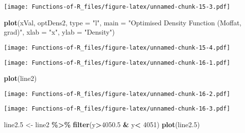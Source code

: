 \documentclass[
]{article}
\newenvironment{Shaded}{\begin{snugshade}}{\end{snugshade}}
\newcommand{\AttributeTok}[1]{\textcolor[rgb]{0.13,0.29,0.53}{#1}}
\newcommand{\CommentTok}[1]{\textcolor[rgb]{0.56,0.35,0.01}{\textit{#1}}}
\newcommand{\DecValTok}[1]{\textcolor[rgb]{0.00,0.00,0.81}{#1}}
\newcommand{\FloatTok}[1]{\textcolor[rgb]{0.00,0.00,0.81}{#1}}
\newcommand{\FunctionTok}[1]{\textcolor[rgb]{0.13,0.29,0.53}{\textbf{#1}}}
\newcommand{\NormalTok}[1]{#1}
\newcommand{\OtherTok}[1]{\textcolor[rgb]{0.56,0.35,0.01}{#1}}
\newcommand{\SpecialCharTok}[1]{\textcolor[rgb]{0.81,0.36,0.00}{\textbf{#1}}}
\newcommand{\StringTok}[1]{\textcolor[rgb]{0.31,0.60,0.02}{#1}}
\begin{document}
\texttt{[image: Functions-of-R\_files/figure-latex/unnamed-chunk-15-3.pdf]}

\begin{Shaded}
\begin{Highlighting}[]
\FunctionTok{plot}\NormalTok{(xVal, optDens2, }\AttributeTok{type =} \StringTok{"l"}\NormalTok{, }\AttributeTok{main =} \StringTok{"Optimised Density Function (Moffat, grad)"}\NormalTok{, }\AttributeTok{xlab =} \StringTok{"x"}\NormalTok{, }\AttributeTok{ylab =} \StringTok{"Density"}\NormalTok{)}
\end{Highlighting}
\end{Shaded}

\texttt{[image: Functions-of-R\_files/figure-latex/unnamed-chunk-15-4.pdf]}

\begin{Shaded}
\end{Shaded}

\texttt{[image: Functions-of-R\_files/figure-latex/unnamed-chunk-16-1.pdf]}

\begin{Shaded}
\begin{Highlighting}[]
\FunctionTok{plot}\NormalTok{(line2)}
\end{Highlighting}
\end{Shaded}

\texttt{[image: Functions-of-R\_files/figure-latex/unnamed-chunk-16-2.pdf]}

\begin{Shaded}
\end{Shaded}

\texttt{[image: Functions-of-R\_files/figure-latex/unnamed-chunk-16-3.pdf]}

\begin{Shaded}
\begin{Highlighting}[]
\NormalTok{line2}\FloatTok{.5} \OtherTok{\textless{}{-}}\NormalTok{ line2 }\SpecialCharTok{\%\textgreater{}\%}
  \FunctionTok{filter}\NormalTok{(y}\SpecialCharTok{\textgreater{}}\FloatTok{4050.5} \SpecialCharTok{\&}\NormalTok{ y}\SpecialCharTok{\textless{}} \DecValTok{4051}\NormalTok{)}
\FunctionTok{plot}\NormalTok{(line2}\FloatTok{.5}\NormalTok{)}
\end{Highlighting}
\end{Shaded}
\end{document}
